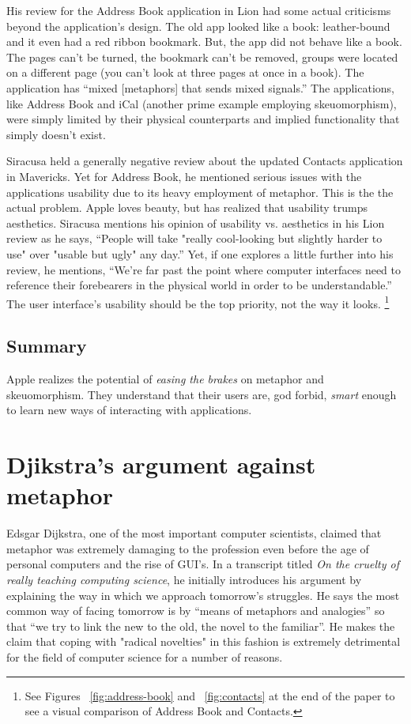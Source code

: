 \documentclass[11pt, oneside]{article}   	%
\begin{document}
His review for the Address Book application in Lion had some actual criticisms beyond the application's design. The old app looked like a book: leather-bound and it even had a red ribbon bookmark. But, the app did not behave like a book. The pages can't be turned, the bookmark can't be removed, groups were located on a different page (you can't look at three pages at once in a book). The application has ``mixed [metaphors] that sends mixed signals.''  The applications, like Address Book and iCal (another prime example employing skeuomorphism), were simply limited by their physical counterparts and implied functionality that simply doesn't exist. \cite{ars-technica-lion}

Siracusa held a generally negative review about the updated Contacts application in Mavericks. Yet for Address Book, he mentioned serious issues with the applications usability due to its heavy employment of metaphor. This is the the actual problem. Apple loves beauty, but has realized that usability trumps aesthetics. Siracusa mentions his opinion of usability vs. aesthetics in his Lion review as he says, ``People will take "really cool-looking but slightly harder to use" over "usable but ugly" any day.'' Yet, if one explores a little further into his review, he mentions, ``We're far past the point where computer interfaces need to reference their forebearers in the physical world in order to be understandable.'' The user interface's usability should be the top priority, not the way it looks. \footnote{See Figures ~\ref{fig:address-book} and ~\ref{fig:contacts} at the end of the paper to see a visual comparison of Address Book and Contacts.}
 
\subsection{Summary}
Apple realizes the potential of \textit{easing the brakes} on metaphor and skeuomorphism. They understand that their users are, god forbid, \textit{smart} enough to learn new ways of interacting with applications.

\section{Djikstra's argument against metaphor}
Edsgar Dijkstra, one of the most important computer scientists, claimed that metaphor was extremely damaging to the profession even before the age of personal computers and the rise of GUI's. In a transcript titled \textit{On the cruelty of really teaching computing science}, he initially introduces his argument by explaining the way in which we approach tomorrow's struggles. He says the most common way of facing tomorrow is by ``means of metaphors and analogies'' so that ``we try to link the new to the old, the novel to the familiar''. He makes the claim that coping with "radical novelties" in this fashion is extremely detrimental for the field of computer science for a number of reasons.
\end{document}
